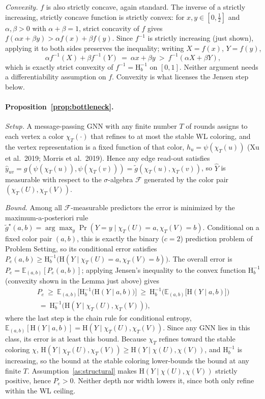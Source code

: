 \documentclass[letterpaper]{article} %
\newcommand{\Hh}{\mathrm{H}}
\theoremstyle{plain}
\theoremstyle{definition}
\begin{document}
\emph{Convexity.} $f$ is also strictly concave, again standard. The inverse of a strictly increasing, strictly concave function is strictly convex: for $x,y\in[0,\tfrac12]$ and $\alpha,\beta>0$ with $\alpha+\beta=1$, strict concavity of $f$ gives $f(\alpha x+\beta y) > \alpha f(x)+\beta f(y)$. Since $f^{-1}$ is strictly increasing (just shown), applying it to both sides preserves the inequality; writing $X=f(x)$, $Y=f(y)$,
\[
\alpha f^{-1}(X)+\beta f^{-1}(Y) \ =\ \alpha x+\beta y \ >\ f^{-1}(\alpha X+\beta Y),
\]
which is exactly strict convexity of $f^{-1}=\Hh_b^{-1}$ on $[0,1]$. Neither argument needs a differentiability assumption on $f$. Convexity is what licenses the Jensen step below.

\paragraph{Proposition~\ref{prop:bottleneck}.}
\emph{Setup.} A message-passing GNN with any finite number $T$ of rounds assigns to each vertex a color $\chi_T(\cdot)$ that refines to at most the stable WL coloring, and the vertex representation is a fixed function of that color, $h_u=\psi(\chi_T(u))$ (Xu et al.\ 2019; Morris et al.\ 2019). Hence any edge read-out satisfies $\hat y_{uv}=g(\psi(\chi_T(u)),\psi(\chi_T(v)))=\tilde g(\chi_T(u),\chi_T(v))$, so $\hat Y$ is measurable with respect to the $\sigma$-algebra $\mathcal{F}$ generated by the color pair $(\chi_T(U),\chi_T(V))$.

\emph{Bound.} Among all $\mathcal{F}$-measurable predictors the error is minimized by the maximum-a-posteriori rule $\tilde g^\star(a,b)=\arg\max_y \Pr(Y=y\mid \chi_T(U)=a,\chi_T(V)=b)$. Conditional on a fixed color pair $(a,b)$, this is exactly the binary ($c=2$) prediction problem of Problem Setting, so its conditional error satisfies $P_e(a,b)\ge \Hh_b^{-1}\big(\Hh(Y\mid \chi_T(U)=a,\chi_T(V)=b)\big)$. The overall error is $P_e=\mathbb{E}_{(a,b)}[P_e(a,b)]$; applying Jensen's inequality to the convex function $\Hh_b^{-1}$ (convexity shown in the Lemma just above) gives
\begin{multline*}
P_e \ \ge\ \mathbb{E}_{(a,b)}\Big[\Hh_b^{-1}\big(\Hh(Y\mid a,b)\big)\Big] \ \ge\ \Hh_b^{-1}\Big(\mathbb{E}_{(a,b)}\big[\Hh(Y\mid a,b)\big]\Big) \\
\ =\ \Hh_b^{-1}\big(\Hh(Y\mid \chi_T(U),\chi_T(V))\big),
\end{multline*}
where the last step is the chain rule for conditional entropy, $\mathbb{E}_{(a,b)}[\Hh(Y\mid a,b)]=\Hh(Y\mid \chi_T(U),\chi_T(V))$. Since any GNN lies in this class, its error is at least this bound. Because $\chi_T$ refines toward the stable coloring $\chi$, $\Hh(Y\mid \chi_T(U),\chi_T(V))\ge \Hh(Y\mid \chi(U),\chi(V))$, and $\Hh_b^{-1}$ is increasing, so the bound at the stable coloring lower-bounds the bound at any finite $T$. Assumption~\ref{as:structural} makes $\Hh(Y\mid \chi(U),\chi(V))$ strictly positive, hence $P_e>0$. Neither depth nor width lowers it, since both only refine within the WL ceiling.
\end{document}
